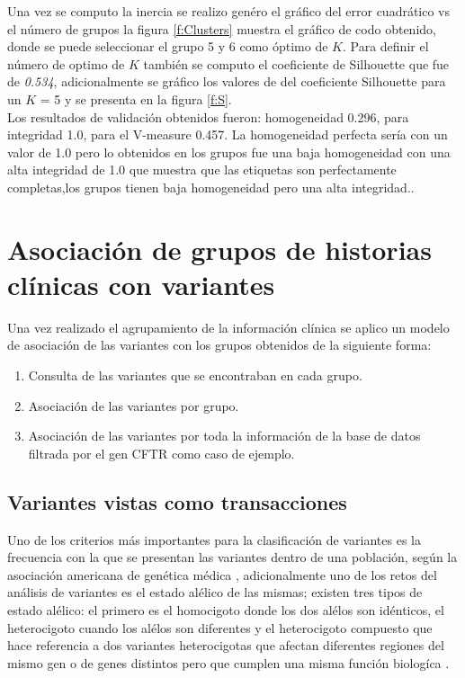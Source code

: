Una vez se computo la inercia se realizo genéro el gráfico del error cuadrático vs el número de grupos  la figura \ref{f:Clusters} muestra el gráfico de codo obtenido, donde se puede seleccionar el grupo 5 y 6 como óptimo de $K$. Para definir el número de optimo de $K$ también se computo el coeficiente de Silhouette  que fue de \textit{0.534}, adicionalmente se gráfico los valores de del coeficiente Silhouette para un $K$ = 5 y se presenta en la figura \ref{f:S}. \\

Los resultados de validación obtenidos fueron: homogeneidad 0.296, para integridad 1.0, para el V-measure 0.457. La homogeneidad perfecta sería con un valor de 1.0 pero lo obtenidos en los grupos fue una baja homogeneidad con una alta  integridad de 1.0 que muestra que las etiquetas son perfectamente completas,los grupos tienen  baja homogeneidad pero una alta integridad.\cite{scikit-learn}. 


\section{Asociación de grupos de historias clínicas con variantes}

Una vez realizado el agrupamiento de la información clínica se aplico un modelo de asociación de las variantes con los grupos obtenidos de la siguiente forma:

\begin{enumerate}
	\item Consulta de las variantes que se encontraban en cada grupo.
	\item Asociación de las variantes por grupo.
	\item Asociación de las variantes por toda la información de la base de datos filtrada por el gen CFTR como caso de ejemplo.
\end{enumerate}

\subsection{Variantes vistas como transacciones}

Uno de los criterios más importantes para la clasificación de variantes es la frecuencia con la que se presentan las variantes dentro de una población, según la asociación americana de genética médica \cite{Laboratories2015}, adicionalmente uno de los retos del análisis de variantes es el estado alélico de las mismas; existen tres tipos de estado alélico: el primero es el homocigoto donde los dos alélos son idénticos, el heterocigoto cuando los alélos son diferentes y el heterocigoto compuesto que hace referencia a dos variantes heterocigotas que afectan diferentes regiones del mismo gen o de genes distintos pero que cumplen una misma función biologíca \cite{Klug2013,Compound2012}.\\

